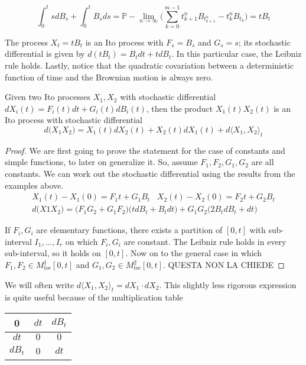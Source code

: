 \begin{equation*}
    \int_0^t s dB_s + \int_0^t B_s ds = \mathbb{P}-\lim_{n \to \infty} \Big( \sum_{k=0}^{m-1} t^n_{k+1} B_{t^n_{k+1}} - t_k^n B_{t_k} \Big) = tB_t
\end{equation*}

The process $X_t = tB_t$ is an Ito process with $F_s = B_s$ and $G_s = s$; its stochastic differential is given by $d(tB_t) = B_t dt + t dB_t$. In this particular case, the Leibniz rule holds. Lastly, notice that the quadratic covariation between a deterministic function of time and the Brownian motion is always zero.   

\begin{theorem}
    Given two Ito processes $X_1,X_2$ with stochastic differential $dX_i(t) = F_i(t)dt+G_i(t)dB_i(t)$, then the product $X_1(t) X_2(t)$ is an Ito process with stochastic differential 
    \begin{equation}
        d\big(X_1 X_2\big) = X_1(t) dX_2(t) + X_2(t) dX_1(t) + d\langle X_1, X_2 \rangle_t
    \end{equation}
\end{theorem}
\begin{proof}
    We are first going to prove the statement for the case of constants and simple 
    functions, to later on generalize it. So, assume $F_1,F_2,G_1,G_2$ are all constants. 
    We can work out the stochastic differential using the results from the examples above. 
    \begin{gather*}
        X_1(t) - X_1(0) = F_1 t+G_1 B_t \;\;\; X_2(t) - X_2(0) = F_2 t+G_2 B_t \\
        d\big(X1 X_2\big) = \big( F_1G_2 + G_1F_2 \big)\big( t dB_t+B_t dt \big) + G_1G_2 \big( 2B_t dB_t + dt \big)
    \end{gather*}

    If $F_i,G_i$ are elementary functions, there exists a partition of $[0,t]$ with sub-interval $I_1,...,I_r$ on which $F_i,G_i$ are constant. The Leibniz rule holds in every sub-interval, so it holds on $[0,t]$. 
    Now on to the general case in which $F_1,F_2 \in M^1_{loc}[0,t]$ and $G_1,G_2 \in M^2_{loc}[0,t]$. QUESTA NON LA CHIEDE

\end{proof}

We will often write $d\langle X_1,X_2 \rangle_t = dX_1 \cdot dX_2$. This slightly less rigorous expression is quite useful because of the multiplication table

\begin{table}[h!]
    \centering
    \begin{tabular}{c|c c}
        0 & $dt$ & $dB_t$ \\
        \hline
        $dt$ & $0$ & $0$ \\
        $dB_t$ & 0 & $dt$
    \end{tabular}
\end{table}

